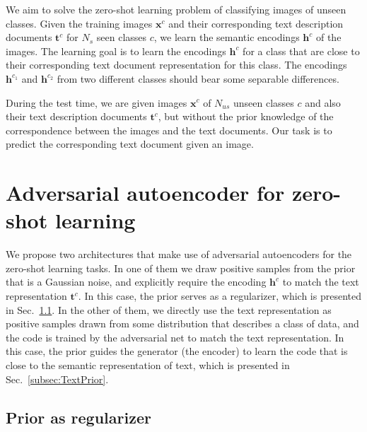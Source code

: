 \documentclass{article}
\newcommand{\bb}[1]{\boldsymbol{#1}}
\begin{document}
	We aim to solve the zero-shot learning problem of classifying images of unseen classes. Given the training images $\bb{x}^c$ and their corresponding text description documents $\bb{t}^c$ for $N_s$ seen classes $c$, we learn the semantic encodings $\bb{h}^c$ of the images. The learning goal is to learn the encodings $\bb{h}^c$ for a class that are close to their corresponding text document representation for this class. The encodings $\bb{h}^{c_1}$ and $\bb{h}^{c_2}$ from two different classes should bear some separable differences.
	
	During the test time, we are given images $\bb{x}^c$ of $N_{us}$ unseen classes $c$ and also their text description documents $\bb{t}^c$, but without the prior knowledge of the correspondence between the images and the text documents. Our task is to predict the corresponding text document given an image.




\section{Adversarial autoencoder for zero-shot learning}

	We propose two architectures that make use of adversarial autoencoders for the zero-shot learning tasks. In one of them we draw positive samples from the prior that is a Gaussian noise, and explicitly require the encoding $\bb{h}^c$ to match the text representation $\bb{t}^c$. In this case, the prior serves as a regularizer, which is presented in Sec.~\ref{subsec:NoisePrior}. In the other of them, we directly use the text representation as positive samples drawn from some distribution that describes a class of data, and the code is trained by the adversarial net to match the text representation. In this case, the prior guides the generator (the encoder) to learn the code that is close to the semantic representation of text, which is presented in Sec.~\ref{subsec:TextPrior}.




\subsection{Prior as regularizer}
\label{subsec:NoisePrior}
	
\end{document}
